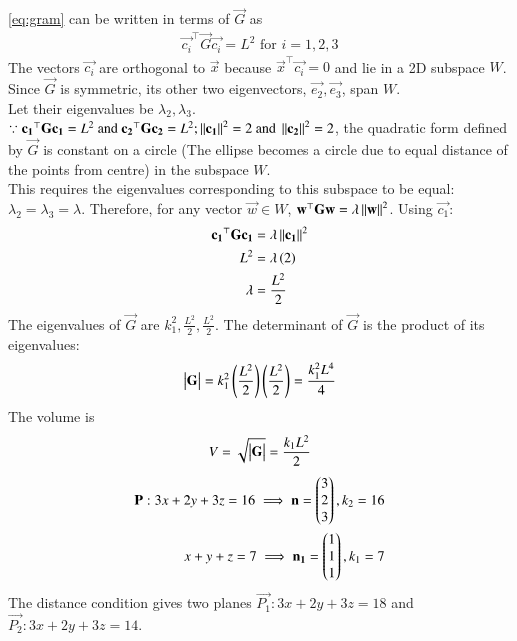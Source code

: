 \documentclass[journal]{IEEEtran}
\begin{document}
\eqref{eq:gram} can be written in terms of $\vec{G}$ as
\begin{align}
    \vec{c_i}^\top \vec{G} \vec{c_i} = L^2 \text{ for } i=1,2,3
\end{align}
The vectors $\vec{c_i}$ are orthogonal to $\vec{x}$ because $\vec{x}^\top\vec{c_i}=0$ and lie in a 2D subspace $W$. \\
Since $\vec{G}$ is symmetric, its other two eigenvectors, $\vec{e_2}, \vec{e_3}$, span $W$. \\
Let their eigenvalues be $\lambda_2, \lambda_3$. \\
$\because \mathbf{c_1}^\top\mathbf{G}\mathbf{c_1} = L^2\text{ and }\mathbf{c_2}^\top\mathbf{G}\mathbf{c_2} = L^2; \left\lVert\mathbf{c_1}\right\rVert^2 = 2\text{ and }\left\lVert\mathbf{c_2}\right\rVert^2 = 2$, the quadratic form defined by $\vec{G}$ is constant on a circle (The ellipse becomes a circle due to equal distance of the points from centre) in the subspace $W$. \\
This requires the eigenvalues corresponding to this subspace to be equal: $\lambda_2 = \lambda_3 = \lambda$.
Therefore, for any vector $\vec{w} \in W$, $\mathbf{w}^\top\mathbf{G}\mathbf{w} = \lambda\left\lVert\mathbf{w}\right\rVert^2$.
Using $\vec{c_1}$:
\begin{align}
    \mathbf{c_1}^\top\mathbf{G}\mathbf{c_1} &= \lambda\left\lVert\mathbf{c_1}\right\rVert^2 \\
    L^2 &= \lambda\left(2\right) \\
    \lambda &= \frac{L^2}{2}
\end{align}
The eigenvalues of $\vec{G}$ are $k_1^2, \frac{L^2}{2}, \frac{L^2}{2}$. The determinant of $\vec{G}$ is the product of its eigenvalues:
\begin{align}
    \begin{vmatrix}\mathbf{G}\end{vmatrix} = k_1^2 \left(\frac{L^2}{2}\right) \left(\frac{L^2}{2}\right) = \frac{k_1^2 L^4}{4}
\end{align}
The volume is 
\begin{align}
    V = \sqrt{\begin{vmatrix}\mathbf{G}\end{vmatrix}} = \frac{k_1 L^2}{2}
\end{align}
\begin{align}
    \mathbf{P}: 3x+2y+3z=16 \implies \mathbf{n} = \begin{pmatrix}3 \\ 2 \\ 3\end{pmatrix}, k_2=16 \\
    x+y+z=7 \implies \mathbf{n_1} = \begin{pmatrix}1 \\ 1 \\ 1\end{pmatrix}, k_1=7 \\
\end{align}
The distance condition gives two planes $\vec{P_1}: 3x+2y+3z=18$ and $\vec{P_2}: 3x+2y+3z=14$. \\
\end{document}
